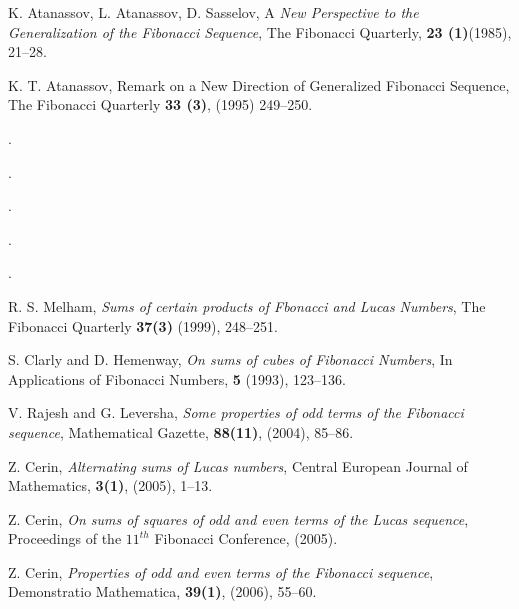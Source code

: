 \begin{thebibliography}{00}
{K. Atanassov, L. Atanassov, D. Sasselov, A\emph{ New Perspective to the Generalization of the Fibonacci Sequence}, The Fibonacci Quarterly, \textbf{23 (1)}(1985), 21--28}.

{K. T. Atanassov, Remark on a New Direction of Generalized Fibonacci Sequence, The Fibonacci Quarterly \textbf{33 (3)}, (1995) 249--250.}

.

.

.

.

.

R. S. Melham, \textit{Sums of certain products of Fbonacci and Lucas Numbers}, The Fibonacci Quarterly \textbf{37(3)} (1999), 248--251.

S. Clarly and D. Hemenway, \textit{On sums of cubes of Fibonacci Numbers}, In Applications of Fibonacci Numbers, \textbf{5} (1993), 123--136.

V. Rajesh and G. Leversha, \textit{Some properties of odd terms of the Fibonacci sequence}, Mathematical Gazette, \textbf{88(11)}, (2004), 85--86.

Z. Cerin, \textit{Alternating sums of Lucas numbers}, Central European Journal of Mathematics, \textbf{3(1)}, (2005), 1--13.

Z. Cerin, \textit{On sums of squares of odd and even terms of the Lucas sequence}, Proceedings of the \textbf{$11^{th}$} Fibonacci Conference, (2005).

Z. Cerin, \textit{Properties of odd and even terms of the Fibonacci sequence}, Demonstratio Mathematica, \textbf{39(1)}, (2006), 55--60.


\end{thebibliography}
